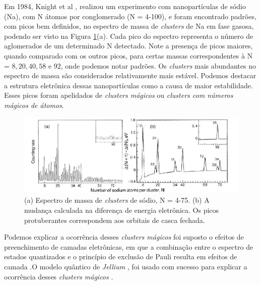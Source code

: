 Em 1984, Knight et al \cite{electronic_Shell_sodium}, realizou um experimento com nanopartículas de sódio (Na), com N átomos por conglomerado (N = 4-100), e foram encontrado padrões, com picos bem definidos, no espectro de massa de \textit{clusters} de Na em fase gasosa, podendo ser visto na Figura \ref{fig:espec_na}(a). Cada pico do espectro representa o número de 
aglomerados de um determinado N detectado. Note a presença de picos maiores, quando comparado com os outros picos, para certas massas correspondentes à N = $8, 20, 40, 58$ e $92$, onde podemos notar padrões. Os \textit{clusters} mais abundantes
no espectro de massa são considerados relativamente mais estável. Podemos destacar a estrutura eletrônica dessas nanopartículas como a causa de maior estabilidade. Esses picos foram apelidados de \textit{clusters mágicos} ou \textit{clusters com números mágicos de átomos}.




\begin{figure}
  \centering
  \includegraphics[width=1\textwidth]{images/clusters/NA_knight}
  \caption{(a) Espectro de massa de \textit{clusters} de sódio, N = 4-75.
  (b) A mudança calculada na diferença de energia eletrônica. Os picos protuberantes correspondem aos orbitais de casca fechada.\cite{electronic_Shell_sodium}  }
  \label{fig:espec_na}
\end{figure}


Podemos explicar a ocorrência desses \textit{clusters mágicos} foi suposto o efeitos de preenchimento de camadas eletrônicas, em que a combinação entre o espectro de estados
quantizados e o princípio de exclusão de Pauli resulta em efeitos de camada \cite{Brack}.O modelo quântico de \textit{Jellium} \cite{Heer}, foi usado com sucesso para explicar a ocorrência desses \textit{clusters mágicos} \cite{capitulo_livro_shell}.

